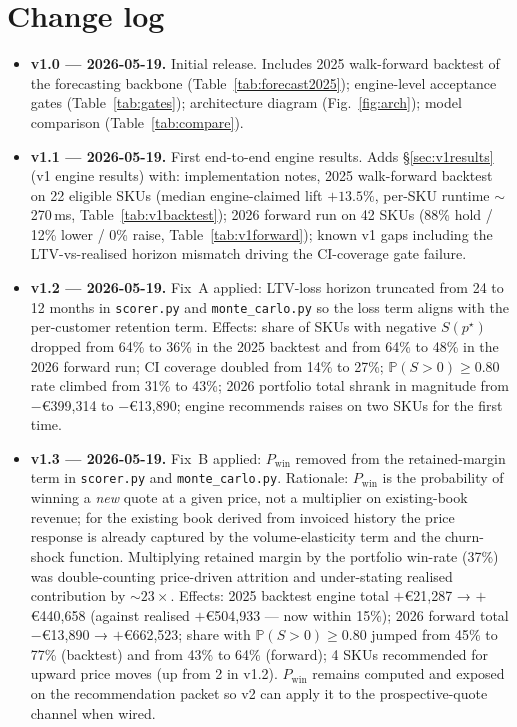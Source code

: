 \documentclass[11pt,a4paper]{article}
\newcommand{\Prob}{\mathbb{P}}
\begin{document}
\section{Change log}
\label{app:changelog}
\begin{itemize}[leftmargin=2em,itemsep=2pt]
  \item \textbf{v1.0 --- 2026-05-19.} Initial release. Includes 2025 walk-forward backtest of the forecasting backbone (Table~\ref{tab:forecast2025}); engine-level acceptance gates (Table~\ref{tab:gates}); architecture diagram (Fig.~\ref{fig:arch}); model comparison (Table~\ref{tab:compare}).
  \item \textbf{v1.1 --- 2026-05-19.} First end-to-end engine results. Adds §\ref{sec:v1results} (v1 engine results) with: implementation notes, 2025 walk-forward backtest on 22 eligible SKUs (median engine-claimed lift $+13.5\%$, per-SKU runtime $\sim$270\,ms, Table~\ref{tab:v1backtest}); 2026 forward run on 42 SKUs (88\% hold / 12\% lower / 0\% raise, Table~\ref{tab:v1forward}); known v1 gaps including the LTV-vs-realised horizon mismatch driving the CI-coverage gate failure.
  \item \textbf{v1.2 --- 2026-05-19.} Fix~A applied: LTV-loss horizon truncated from 24 to 12 months in \texttt{scorer.py} and \texttt{monte\_carlo.py} so the loss term aligns with the per-customer retention term. Effects: share of SKUs with negative $S(p^\star)$ dropped from 64\% to 36\% in the 2025 backtest and from 64\% to 48\% in the 2026 forward run; CI coverage doubled from 14\% to 27\%; $\Prob(S>0) \geq 0.80$ rate climbed from 31\% to 43\%; 2026 portfolio total shrank in magnitude from $-$€399{,}314 to $-$€13{,}890; engine recommends raises on two SKUs for the first time.
  \item \textbf{v1.3 --- 2026-05-19.} Fix~B applied: $P_{\text{win}}$ removed from the retained-margin term in \texttt{scorer.py} and \texttt{monte\_carlo.py}. Rationale: $P_{\text{win}}$ is the probability of winning a \emph{new} quote at a given price, not a multiplier on existing-book revenue; for the existing book derived from invoiced history the price response is already captured by the volume-elasticity term and the churn-shock function. Multiplying retained margin by the portfolio win-rate (37\%) was double-counting price-driven attrition and under-stating realised contribution by ${\sim}23\times$. Effects: 2025 backtest engine total $+$€21{,}287 → $+$€440{,}658 (against realised $+$€504{,}933 --- now within 15\%); 2026 forward total $-$€13{,}890 → $+$€662{,}523; share with $\Prob(S>0) \geq 0.80$ jumped from 45\% to 77\% (backtest) and from 43\% to 64\% (forward); 4 SKUs recommended for upward price moves (up from 2 in v1.2). $P_{\text{win}}$ remains computed and exposed on the recommendation packet so v2 can apply it to the prospective-quote channel when wired.

\end{itemize}
\end{document}
